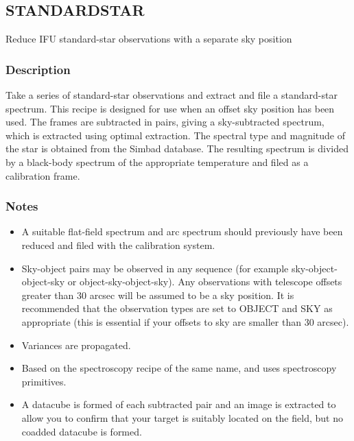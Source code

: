 \documentclass[twoside,11pt]{article}
\renewcommand{\_}{\texttt{\symbol{95}}}
\begin{document}
\clearpage



\subsection{STANDARD\_STAR}

Reduce IFU standard-star observations with a separate sky position

\subsubsection*{Description}

Take a series of standard-star observations and extract and file a
standard-star spectrum. This recipe is designed for use when an offset
sky position has been used. The frames are subtracted in pairs, giving
a sky-subtracted spectrum, which is extracted using optimal
extraction. The spectral type and magnitude of the star is obtained
from the Simbad database. The resulting spectrum is divided by a
black-body spectrum of the appropriate temperature and filed as a
calibration frame.

\subsubsection*{Notes}\begin{itemize}

\item

  A suitable flat-field spectrum and arc spectrum should previously
  have been reduced and filed with the calibration system.

\item

  Sky-object pairs may be observed in any sequence (for example
  sky-object-object-sky or object-sky-object-sky). Any observations
  with telescope offsets greater than 30 arcsec will be assumed to be
  a sky position. It is recommended that the observation types are set
  to OBJECT and SKY as appropriate (this is essential if your offsets
  to sky are smaller than 30 arcsec).

\item

  Variances are propagated.

\item

  Based on the spectroscopy recipe of the same name, and uses
  spectroscopy primitives.

\item

A datacube is formed of each subtracted pair and an image is extracted
to allow you to confirm that your target is suitably located on the
field, but no coadded datacube is formed.

\end{itemize}
\end{document}

